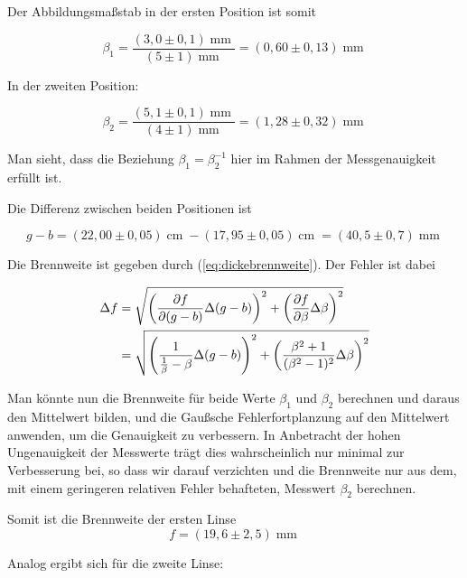 \documentclass[a4paper,german,12pt,smallheadings]{scrartcl}
\begin{document}
Der Abbildungsmaßstab in der ersten Position ist somit

\begin{equation}
  \beta_1 = \frac{(3{,}0 \pm 0{,}1) \operatorname{mm}}{(5\pm1) \operatorname{mm}} = (0{,}60\pm0{,}13) \operatorname{mm}
\end{equation}

In der zweiten Position:

\begin{equation}
  \beta_2 = \frac{(5{,}1\pm0{,}1) \operatorname{mm}}{(4\pm1) \operatorname{mm}} = (1{,}28\pm 0{,}32) \operatorname{mm}
\end{equation}

Man sieht, dass die Beziehung $\beta_1 = \beta_2^{-1}$ hier im Rahmen der
Messgenauigkeit erfüllt ist.

Die Differenz zwischen beiden Positionen ist

\begin{equation}
  g - b = (22{,}00 \pm 0{,}05) \operatorname{cm}
        - (17{,}95 \pm 0{,}05) \operatorname{cm} = (40{,}5 \pm 0{,}7) \operatorname{mm}
\end{equation}

Die Brennweite ist gegeben durch (\ref{eq:dickebrennweite}). Der Fehler ist
dabei

\begin{align*}
  \Delta f &= \sqrt{
    \del{\frac{\partial f}{\partial (g-b)} \Delta(g-b)}^2 +
    \del{\frac{\partial f}{\partial \beta} \Delta \beta}^2
  } \\
  &= \sqrt{
    \del{\frac{1}{\frac{1}{\beta} - \beta} \Delta(g-b)}^2 +
    \del{\frac{\beta^2 + 1}{(\beta^2 -1)^2} \Delta \beta}^2
  }
\end{align*}

Man könnte nun die Brennweite für beide Werte $\beta_1$ und $\beta_2$ berechnen
und daraus den Mittelwert bilden, und die Gaußsche
Fehlerfortplanzung auf den Mittelwert anwenden, um die Genauigkeit zu
verbessern. In Anbetracht der hohen Ungenauigkeit der Messwerte trägt dies
wahrscheinlich nur minimal zur Verbesserung bei, so dass wir darauf verzichten
und die Brennweite nur aus dem, mit einem geringeren relativen Fehler
behafteten, Messwert $\beta_2$ berechnen.

Somit ist die Brennweite der ersten Linse
\begin{equation}
  f = (19{,}6\pm2{,}5) \operatorname{mm}
\end{equation}

Analog ergibt sich für die zweite Linse:
\end{document}
